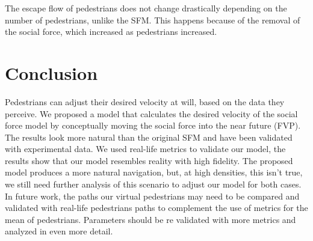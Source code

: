 \documentclass[english]{article}
\begin{document}
    The escape flow of pedestrians does not change drastically depending on the
    number of pedestrians, unlike the SFM. This happens because of the removal
    of the social force, which increased as pedestrians increased.

\section{Conclusion}
    
    Pedestrians can adjust their desired velocity at will, based on the
    data they perceive. We proposed a model that calculates the desired
    velocity of the social force model by conceptually moving the social
    force into the near future (FVP). The results look more natural than
    the original SFM and have been validated with experimental data. We
    used real-life metrics to validate our model, the results show that
    our model resembles reality with high fidelity. The proposed model
    produces a more natural navigation, but, at high densities, this isn't
    true, we still need further analysis of this scenario to adjust our
    model for both cases. \\
    In future work, the paths our virtual pedestrians
    may need to be compared and validated with real-life pedestrians
    paths to complement the use of metrics for the mean of pedestrians.
    Parameters should be re validated with more metrics and analyzed in
    even more detail. \\
\newpage{}
\end{document}

